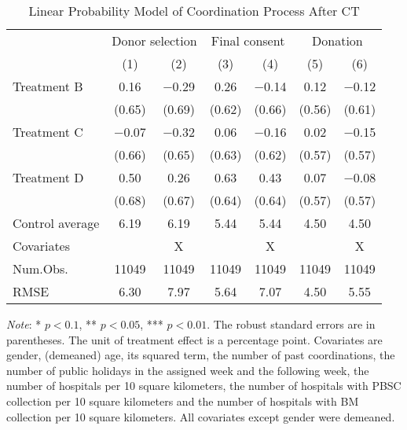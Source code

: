 \documentclass[12pt, a4paper]{article}
\begin{document}
\begin{table}

\caption{\label{tab:lm-coordinate}Linear Probability Model of Coordination Process After CT}
\centering
\fontsize{8}{10}\selectfont
\begin{threeparttable}
\begin{tabular}[t]{lcccccc}
\toprule
\multicolumn{1}{c}{ } & \multicolumn{2}{c}{Donor selection} & \multicolumn{2}{c}{Final consent} & \multicolumn{2}{c}{Donation} \\
\cmidrule(l{3pt}r{3pt}){2-3} \cmidrule(l{3pt}r{3pt}){4-5} \cmidrule(l{3pt}r{3pt}){6-7}
  & (1) & (2) & (3) & (4) & (5) & (6)\\
\midrule
Treatment B & \num{0.16} & \num{-0.29} & \num{0.26} & \num{-0.14} & \num{0.12} & \num{-0.12}\\
 & (\num{0.65}) & (\num{0.69}) & (\num{0.62}) & (\num{0.66}) & (\num{0.56}) & (\num{0.61})\\
Treatment C & \num{-0.07} & \num{-0.32} & \num{0.06} & \num{-0.16} & \num{0.02} & \num{-0.15}\\
 & (\num{0.66}) & (\num{0.65}) & (\num{0.63}) & (\num{0.62}) & (\num{0.57}) & (\num{0.57})\\
Treatment D & \num{0.50} & \num{0.26} & \num{0.63} & \num{0.43} & \num{0.07} & \num{-0.08}\\
 & (\num{0.68}) & (\num{0.67}) & (\num{0.64}) & (\num{0.64}) & (\num{0.57}) & (\num{0.57})\\
\midrule
Control average & 6.19 & 6.19 & 5.44 & 5.44 & 4.50 & 4.50\\
Covariates &  & X &  & X &  & X\\
Num.Obs. & \num{11049} & \num{11049} & \num{11049} & \num{11049} & \num{11049} & \num{11049}\\
RMSE & \num{6.30} & \num{7.97} & \num{5.64} & \num{7.07} & \num{4.50} & \num{5.55}\\
\bottomrule
\end{tabular}
\begin{tablenotes}
\item \emph{Note}: * $p < 0.1$, ** $p < 0.05$, *** $p < 0.01$. The robust standard errors are in parentheses. The unit of treatment effect is a percentage point. Covariates are gender, (demeaned) age, its squared term, the number of past coordinations, the number of public holidays in the assigned week and the following week, the number of hospitals per 10 square kilometers, the number of hospitals with PBSC collection per 10 square kilometers and the number of hospitals with BM collection per 10 square kilometers. All covariates except gender were demeaned.
\end{tablenotes}
\end{threeparttable}
\end{table}
\end{document}
